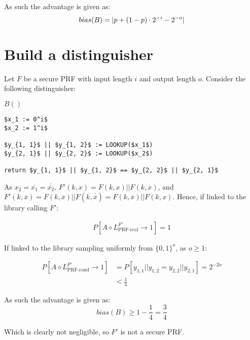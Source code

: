 \documentclass[a4paper]{scrreprt}
\DeclarePairedDelimiter\abs{\lvert}{\rvert}
\begin{document}
As such the advantage is given as:
\[
	bias(B) = \abs{p + (1 - p) \cdot 2^{-i} - 2^{-o}}
\]

\newpage

\section{Build a distinguisher}

Let $F$ be a secure PRF with input length $i$ and output length $o$. Consider
the following distinguisher:

\begin{library}{$B()$}
	\begin{lstlisting}[mathescape=true]
$x_1 := 0^i$
$x_2 := 1^i$

$y_{1, 1}$ || $y_{1, 2}$ := LOOKUP($x_1$)
$y_{2, 1}$ || $y_{2, 2}$ := LOOKUP($x_2$)

return $y_{1, 1}$ || $y_{1, 2}$ == $y_{2, 2}$ || $y_{2, 1}$
	\end{lstlisting}
\end{library}

As $x_2 = \overline{x_1} = \overline{\overline{x_2}}$, $F'(k, x) = F(k, x) ||
F(k, \overline{x})$, and $F'(k, \overline{x}) = F(k, \overline{x}) || F(k,
\overline{\overline{x}}) = F(k, \overline{x}) || F(k, x)$. Hence, if linked to
the library calling $F'$:

\begin{align*}
	P[A \diamond L^{F'}_{\text{PRF-real}} \rightarrow 1] = 1
\end{align*}

If linked to the library sampling uniformly from $\{0, 1\}^o$, as $o \geq 1$:

\begin{align*}
	P[A \diamond L^{F'}_{\text{PRF-rand}} \rightarrow 1] & = P[y_{1, 1} || y_{1, 2} = y_{2, 2} || y_{2, 1}] = 2^{-2 o} \\
	& < \frac{1}{4}
\end{align*}

As such the advantage is given as:
\[
	bias(B) \geq 1 - \frac{1}{4} = \frac{3}{4}
\]

Which is clearly not negligible, so $F'$ is not a secure PRF.
\end{document}
